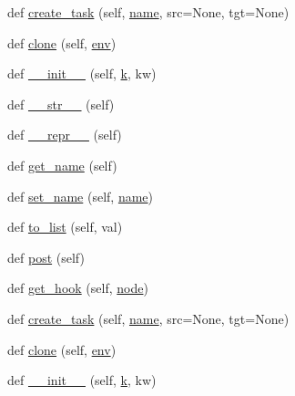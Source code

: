 \begin{DoxyCompactItemize}
\item 
def \hyperlink{classwaflib_1_1_task_gen_1_1task__gen_ad432ecefdf2362d1cccf1dad31fac2d3}{create\+\_\+task} (self, \hyperlink{lib_2expat_8h_a1b49b495b59f9e73205b69ad1a2965b0}{name}, src=None, tgt=None)
\item 
def \hyperlink{classwaflib_1_1_task_gen_1_1task__gen_a7b7e036b797a0532ce6be8df951ba048}{clone} (self, \hyperlink{classwaflib_1_1_task_gen_1_1task__gen_a4d6f968ce8718fdf77d46ea3b56def1e}{env})
\item 
def \hyperlink{classwaflib_1_1_task_gen_1_1task__gen_a17ba35bed2219481190d515ffef57404}{\+\_\+\+\_\+init\+\_\+\+\_\+} (self, \hyperlink{rfft2d_test_m_l_8m_adc468c70fb574ebd07287b38d0d0676d}{k}, kw)
\item 
def \hyperlink{classwaflib_1_1_task_gen_1_1task__gen_a48c763160308a6ff809b7048702618b1}{\+\_\+\+\_\+str\+\_\+\+\_\+} (self)
\item 
def \hyperlink{classwaflib_1_1_task_gen_1_1task__gen_a040db536e5d7fe5054c9e9da52f36eb0}{\+\_\+\+\_\+repr\+\_\+\+\_\+} (self)
\item 
def \hyperlink{classwaflib_1_1_task_gen_1_1task__gen_a50370e76b549fc3bd0369c35f4fc1bab}{get\+\_\+name} (self)
\item 
def \hyperlink{classwaflib_1_1_task_gen_1_1task__gen_a79705c7a6b9b09021ee549e428c5a5c1}{set\+\_\+name} (self, \hyperlink{lib_2expat_8h_a1b49b495b59f9e73205b69ad1a2965b0}{name})
\item 
def \hyperlink{classwaflib_1_1_task_gen_1_1task__gen_a31a9f508654465cd5fe9f3baaaf77ec4}{to\+\_\+list} (self, val)
\item 
def \hyperlink{classwaflib_1_1_task_gen_1_1task__gen_aa00dedae17f7fa03c169f0e4bdab7414}{post} (self)
\item 
def \hyperlink{classwaflib_1_1_task_gen_1_1task__gen_a19b53157d4411479cf8f55e0ef0edfec}{get\+\_\+hook} (self, \hyperlink{structnode}{node})
\item 
def \hyperlink{classwaflib_1_1_task_gen_1_1task__gen_ad432ecefdf2362d1cccf1dad31fac2d3}{create\+\_\+task} (self, \hyperlink{lib_2expat_8h_a1b49b495b59f9e73205b69ad1a2965b0}{name}, src=None, tgt=None)
\item 
def \hyperlink{classwaflib_1_1_task_gen_1_1task__gen_a7b7e036b797a0532ce6be8df951ba048}{clone} (self, \hyperlink{classwaflib_1_1_task_gen_1_1task__gen_a4d6f968ce8718fdf77d46ea3b56def1e}{env})
\item 
def \hyperlink{classwaflib_1_1_task_gen_1_1task__gen_a17ba35bed2219481190d515ffef57404}{\+\_\+\+\_\+init\+\_\+\+\_\+} (self, \hyperlink{rfft2d_test_m_l_8m_adc468c70fb574ebd07287b38d0d0676d}{k}, kw)

\end{DoxyCompactItemize}
